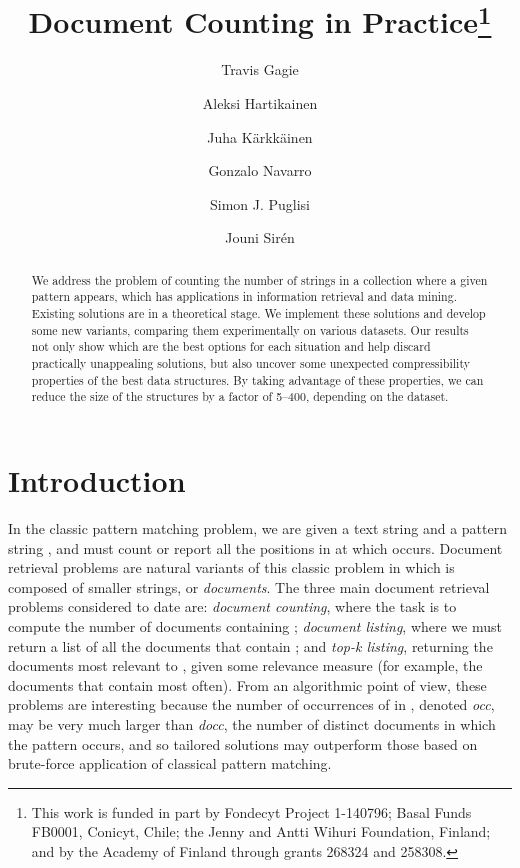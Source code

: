 \documentclass[11pt]{llncs}
\begin{document}
\title{Document Counting in Practice\thanks{This work is funded in part by Fondecyt Project 1-140796; 
Basal Funds FB0001, Conicyt, Chile; the Jenny and Antti Wihuri Foundation, Finland; and by 
the Academy of Finland through grants 268324 and 258308.}}

\author{
Travis Gagie
\and
Aleksi Hartikainen
\and
Juha K{\"a}rkk{\"a}inen
\and
Gonzalo Navarro
\and
Simon J. Puglisi
\and
Jouni Sir\'en
}

\institute{
    Department of Computer Science,\\
    University of Helsinki, Finland\\
    \email{\{gagie,alhartik,tpkarkka,puglisi\}@cs.helsinki.fi}\1ex]
}

\date{}

\maketitle \thispagestyle{empty}
\setcounter{page}{0}

\begin{abstract}
We address the problem of counting the number of strings in a collection where
a given pattern appears, which has applications in information retrieval and
data mining. Existing solutions are in a theoretical stage. We implement
these solutions and develop some new variants, comparing them experimentally on
various datasets. Our results not only show which are the best options for 
each situation and help discard practically unappealing solutions, but 
also uncover some unexpected compressibility properties of the best data 
structures. By taking advantage of these properties, we can reduce the size of
the structures by a factor of 5--400, depending on the dataset.
\end{abstract}

\newpage

\section{Introduction}

In the classic pattern matching problem, we are given a text string  and a pattern string ,
and must count or report all the positions in  at which  occurs.
Document retrieval problems are natural variants of this classic problem in which  is composed of  
smaller strings, or {\em documents}.
The three main document retrieval problems considered to date are: {\em document counting}, 
where the task is to compute the number of documents containing ; {\em document listing}, where 
we must return a list of all the documents that contain ; and {\em top-k listing}, returning the  
documents most relevant to , given some relevance measure (for example, the  documents that 
contain  most often). From an algorithmic point of view, these problems are interesting because
the number of occurrences of  in , denoted {\em occ}, may be very much larger than {\em docc}, 
the number of distinct documents in which the pattern occurs, and so tailored solutions may outperform
those based on brute-force application of classical pattern matching. 
\end{document}
